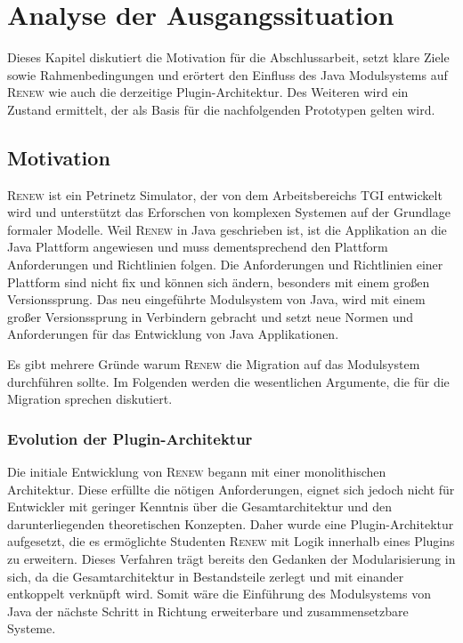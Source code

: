 \chapter{Analyse der Ausgangssituation} \label{cha:ausgangssituation}
	Dieses Kapitel diskutiert die Motivation für die Abschlussarbeit, setzt klare Ziele sowie Rahmenbedingungen und erörtert den Einfluss des Java Modulsystems auf \textsc{Renew} wie auch die derzeitige Plugin-Architektur. Des Weiteren wird ein Zustand ermittelt, der als Basis für die nachfolgenden Prototypen gelten wird.

\section{Motivation}\label{sec:motivation}
	\textsc{Renew} ist ein Petrinetz Simulator, der von dem Arbeitsbereichs TGI entwickelt wird und unterstützt das Erforschen von komplexen Systemen auf der Grundlage formaler Modelle.\newline
	Weil \textsc{Renew} in Java geschrieben ist, ist die Applikation an die Java Plattform angewiesen und muss dementsprechend den Plattform Anforderungen und Richtlinien folgen. Die Anforderungen und Richtlinien einer Plattform sind nicht fix und können sich ändern, besonders mit einem großen Versionssprung. Das neu eingeführte Modulsystem von Java, wird mit einem großer Versionssprung in Verbindern gebracht und setzt neue Normen und Anforderungen für das Entwicklung von Java Applikationen. \bigbreak
	
	Es gibt mehrere Gründe warum \textsc{Renew} die Migration auf das Modulsystem durchführen sollte. Im Folgenden werden die wesentlichen Argumente, die für die Migration sprechen diskutiert.  

	\subsection{Evolution der Plugin-Architektur} \label{sub:architektur}
		Die initiale Entwicklung von \textsc{Renew} begann mit einer monolithischen Architektur. Diese erfüllte die nötigen Anforderungen, eignet sich jedoch nicht für Entwickler mit geringer Kenntnis über die Gesamtarchitektur und den darunterliegenden theoretischen Konzepten. Daher wurde eine Plugin-Architektur aufgesetzt, die es ermöglichte Studenten \textsc{Renew} mit Logik innerhalb eines Plugins zu erweitern. Dieses Verfahren trägt bereits den Gedanken der Modularisierung in sich, da die Gesamtarchitektur in Bestandsteile zerlegt und mit einander entkoppelt verknüpft wird. Somit wäre die Einführung des Modulsystems von Java der nächste Schritt in Richtung erweiterbare und zusammensetzbare Systeme.

